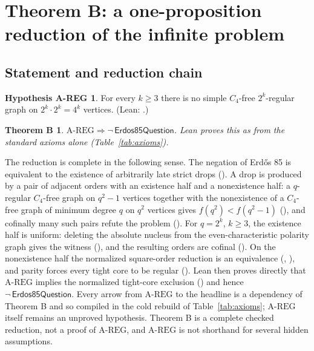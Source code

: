 \documentclass{anvil-paper}
\newcommand{\AREG}{\mathrm{A\text{-}REG}}
\newcommand{\Qn}{\textsf{Erdos85Question}}
\newtheorem*{theoremB}{Theorem B}
\theoremstyle{definition}
\newtheorem*{hypAREG}{Hypothesis A-REG}
\begin{document}
\section{Theorem B: a one-proposition reduction of the infinite problem}\label{sec:theoremB}

\subsection{Statement and reduction chain}\label{sec:chain}

\begin{hypAREG}
For every $k\ge 3$ there is no simple $C_4$-free $2^k$-regular graph on $2^k\cdot 2^k=4^k$ vertices. (Lean: .)
\end{hypAREG}

\begin{theoremB}
$\AREG\Rightarrow\neg\,\Qn$. Lean proves this as  from the standard axioms alone (Table~\ref{tab:axioms}).
\end{theoremB}

The reduction is complete in the following sense. The negation of Erdős 85 is equivalent to the existence of arbitrarily late strict drops (). A drop is produced by a pair of adjacent orders with an existence half and a nonexistence half: a $q$-regular $C_4$-free graph on $q^2-1$ vertices together with the nonexistence of a $C_4$-free graph of minimum degree $q$ on $q^2$ vertices gives $f(q^2)<f(q^2-1)$ (), and cofinally many such pairs refute the problem (). For $q=2^k$, $k\ge 3$, the existence half is uniform: deleting the absolute nucleus from the even-characteristic polarity graph gives the witness (), and the resulting orders are cofinal (). On the nonexistence half the normalized square-order reduction is an equivalence (, ), and parity forces every tight core to be regular (). Lean then proves directly that $\AREG$ implies the normalized tight-core exclusion () and hence $\neg\,\Qn$. Every arrow from $\AREG$ to the headline is a dependency of Theorem B and so compiled in the cold rebuild of Table~\ref{tab:axioms}; $\AREG$ itself remains an unproved hypothesis. Theorem B is a complete checked reduction, not a proof of $\AREG$, and $\AREG$ is not shorthand for several hidden assumptions.
\end{document}
